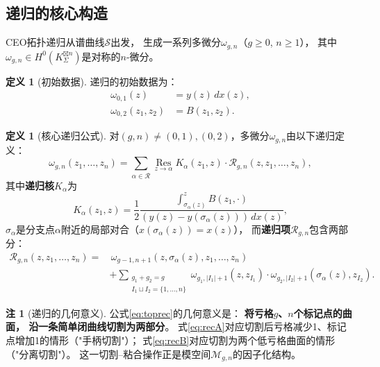 \documentclass[11pt,a4paper]{article}
\theoremstyle{plain}
\theoremstyle{definition}
\newtheorem{definition}[theorem]{定义}
\newtheorem{remark}[theorem]{注}
\newcommand{\Mcal}{\mathcal{M}}
\begin{document}
\subsection{递归的核心构造}

CEO拓扑递归从谱曲线$\mathcal{S}$出发，
生成一系列多微分$\omega_{g,n}$（$g \geq 0$, $n \geq 1$），
其中$\omega_{g,n} \in H^0(K_\Sigma^{\boxtimes n})$是对称的$n$-微分。

\begin{definition}[初始数据]\label{def:initial}
递归的初始数据为：
\begin{align}
\omega_{0,1}(z) &= y(z) \, dx(z), \label{eq:omega01} \\
\omega_{0,2}(z_1, z_2) &= B(z_1, z_2). \label{eq:omega02}
\end{align}
\end{definition}

\begin{definition}[核心递归公式]\label{def:toprec}
对$(g, n) \neq (0, 1), (0, 2)$，多微分$\omega_{g,n}$由以下递归定义：
\begin{equation}\label{eq:toprec}
\omega_{g,n}(z_1, \ldots, z_n)
= \sum_{\alpha \in \mathcal{R}} \operatorname*{Res}_{z \to \alpha}
K_\alpha(z_1, z) \cdot \mathcal{R}_{g,n}(z, z_1, \ldots, z_n),
\end{equation}
其中\textbf{递归核}$K_\alpha$为
\begin{equation}\label{eq:kernel}
K_\alpha(z_1, z) = \frac{1}{2} \frac{\int_{\sigma_\alpha(z)}^z B(z_1, \cdot)}
{(y(z) - y(\sigma_\alpha(z))) \, dx(z)},
\end{equation}
$\sigma_\alpha$是分支点$\alpha$附近的局部对合（$x(\sigma_\alpha(z)) = x(z)$），
而\textbf{递归项}$\mathcal{R}_{g,n}$包含两部分：
\begin{align}
\mathcal{R}_{g,n}(z, z_1, \ldots, z_n)
= &\, \omega_{g-1, n+1}(z, \sigma_\alpha(z), z_1, \ldots, z_n) \label{eq:recA} \\
&+ \sum_{\substack{g_1+g_2=g \\ I_1 \sqcup I_2 = \{1,\ldots,n\}}}
\omega_{g_1, |I_1|+1}(z, z_{I_1}) \cdot \omega_{g_2, |I_2|+1}(\sigma_\alpha(z), z_{I_2}). \label{eq:recB}
\end{align}
\end{definition}

\begin{remark}[递归的几何意义]\label{rmk:recgeom}
公式\eqref{eq:toprec}的几何意义是：
\textbf{将亏格$g$、$n$个标记点的曲面，
沿一条简单闭曲线切割为两部分}。
式\eqref{eq:recA}对应切割后亏格减少1、标记点增加1的情形（"手柄切割"）；
式\eqref{eq:recB}对应切割为两个低亏格曲面的情形（"分离切割"）。
这一切割--粘合操作正是模空间$\Mcal_{g,n}$的因子化结构。
\end{remark}
\end{document}
